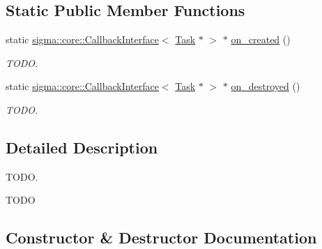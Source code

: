 \subsection*{Static Public Member Functions}
\begin{DoxyCompactItemize}
\item 
\hypertarget{classsigma_1_1core_1_1tasks_1_1_task_ab5adda36bbe6b20916f582ffeb311a13}{}static \hyperlink{classsigma_1_1core_1_1_callback_interface}{sigma\+::core\+::\+Callback\+Interface}$<$ \hyperlink{classsigma_1_1core_1_1tasks_1_1_task}{Task} $\ast$ $>$ $\ast$ \hyperlink{classsigma_1_1core_1_1tasks_1_1_task_ab5adda36bbe6b20916f582ffeb311a13}{on\+\_\+created} ()\label{classsigma_1_1core_1_1tasks_1_1_task_ab5adda36bbe6b20916f582ffeb311a13}

\begin{DoxyCompactList}\small\item\em T\+O\+D\+O. \end{DoxyCompactList}\item 
\hypertarget{classsigma_1_1core_1_1tasks_1_1_task_a720571d12a0e2b41c918f448f5fc81db}{}static \hyperlink{classsigma_1_1core_1_1_callback_interface}{sigma\+::core\+::\+Callback\+Interface}$<$ \hyperlink{classsigma_1_1core_1_1tasks_1_1_task}{Task} $\ast$ $>$ $\ast$ \hyperlink{classsigma_1_1core_1_1tasks_1_1_task_a720571d12a0e2b41c918f448f5fc81db}{on\+\_\+destroyed} ()\label{classsigma_1_1core_1_1tasks_1_1_task_a720571d12a0e2b41c918f448f5fc81db}

\begin{DoxyCompactList}\small\item\em T\+O\+D\+O. \end{DoxyCompactList}\end{DoxyCompactItemize}


\subsection{Detailed Description}
T\+O\+D\+O. 

T\+O\+D\+O 

\subsection{Constructor \& Destructor Documentation}
\hypertarget{classsigma_1_1core_1_1tasks_1_1_task_a0e0bb9899317a89bf9e49bd04513bc04}{}
